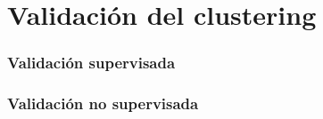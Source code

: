 \section{Validación del clustering}\label{sec:validation}

\begin{frame}
    \frametitle{Validación supervisada}

\end{frame}

\begin{frame}
    \frametitle{Validación no supervisada}

\end{frame}
